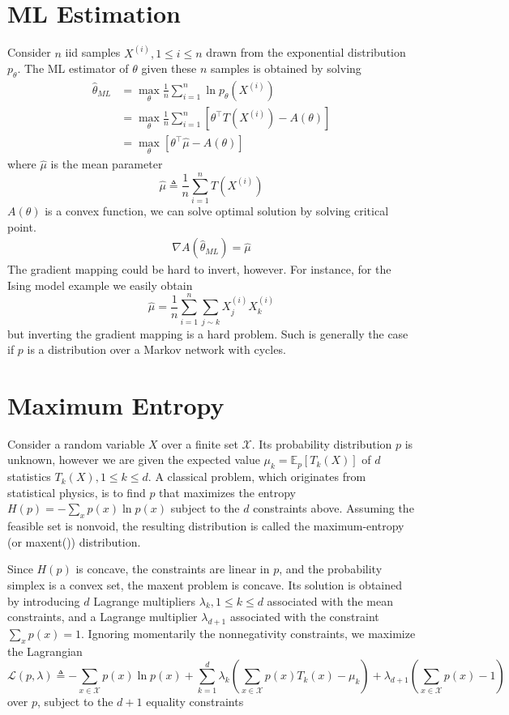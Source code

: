 \documentclass[11pt]{elegantbook}
\begin{document}
\section{ML Estimation}
Consider $n$ iid samples $X^{(i)}, 1 \leq i \leq n$ drawn from the exponential distribution $p_\theta$. The ML estimator of $\theta$ given these $n$ samples is obtained by solving
$$
\begin{aligned}
\hat{\theta}_{ML}&=\max _\theta \frac{1}{n} \sum_{i=1}^n \ln p_\theta\left(X^{(i)}\right)\\
&=\max _\theta \frac{1}{n} \sum_{i=1}^n\left[\theta^{\top} T\left(X^{(i)}\right)-A(\theta)\right] \\
&=\max _\theta\left[\theta^{\top} \hat{\mu}-A(\theta)\right]
\end{aligned}
$$
where $\hat{\mu}$ is the mean parameter
$$
\hat{\mu} \triangleq \frac{1}{n} \sum_{i=1}^n T\left(X^{(i)}\right)
$$
$A(\theta)$ is a convex function, we can solve optimal solution by solving critical point.
\begin{equation}
    \begin{aligned}
        \nabla A(\hat{\theta}_{ML})=\hat{\mu}
    \end{aligned}
    \nonumber
\end{equation}
The gradient mapping could be hard to invert, however. For instance, for the Ising model example we easily obtain
$$
\hat{\mu}=\frac{1}{n} \sum_{i=1}^n \sum_{j \sim k} X_j^{(i)} X_k^{(i)}
$$
but inverting the gradient mapping is a hard problem. Such is generally the case if $p$ is a distribution over a Markov network with cycles.

\section{Maximum Entropy}
Consider a random variable $X$ over a finite set $\mathcal{X}$. Its probability distribution $p$ is unknown, however we are given the expected value $\mu_k=\mathbb{E}_p\left[T_k(X)\right]$ of $d$ statistics $T_k(X), 1 \leq k \leq d$. A classical problem, which originates from statistical physics, is to find $p$ that maximizes the entropy $H(p)=-\sum_x p(x) \ln p(x)$ subject to the $d$ constraints above. Assuming the feasible set is nonvoid, the resulting distribution is called the maximum-entropy (or maxent()) distribution.

Since $H(p)$ is concave, the constraints are linear in $p$, and the probability simplex is a convex set, the maxent problem is concave. Its solution is obtained by introducing $d$ Lagrange multipliers $\lambda_k, 1 \leq k \leq d$ associated with the mean constraints, and a Lagrange multiplier $\lambda_{d+1}$ associated with the constraint $\sum_x p(x)=1$. Ignoring momentarily the nonnegativity constraints, we maximize the Lagrangian
$$
\mathcal{L}(p, \lambda) \triangleq-\sum_{x \in \mathcal{X}} p(x) \ln p(x)+\sum_{k=1}^d \lambda_k\left(\sum_{x \in \mathcal{X}} p(x) T_k(x)-\mu_k\right)+\lambda_{d+1}\left(\sum_{x \in \mathcal{X}} p(x)-1\right)
$$
over $p$, subject to the $d+1$ equality constraints
\end{document}
